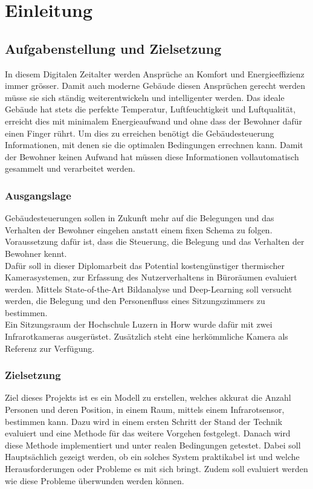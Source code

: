 \chapter{Einleitung}

\section{Aufgabenstellung und Zielsetzung}

In diesem Digitalen Zeitalter werden Ansprüche an Komfort und Energieeffizienz immer grösser. Damit auch moderne Gebäude diesen Ansprüchen gerecht werden müsse sie sich ständig weiterentwickeln und intelligenter werden. Das ideale Gebäude hat stets die perfekte Temperatur, Luftfeuchtigkeit und Luftqualität, erreicht dies mit minimalem Energieaufwand und ohne dass der Bewohner dafür einen Finger rührt. Um dies zu erreichen benötigt die Gebäudesteuerung Informationen, mit denen sie die optimalen Bedingungen errechnen kann. Damit der Bewohner keinen Aufwand hat müssen diese Informationen vollautomatisch gesammelt und verarbeitet werden.

\subsection{Ausgangslage}
\label{sec:Ausgangslage}

Gebäudesteuerungen sollen in Zukunft mehr auf die Belegungen und das Verhalten der Bewohner eingehen anstatt einem fixen Schema zu folgen. Voraussetzung dafür ist, dass die Steuerung, die Belegung und das Verhalten der Bewohner kennt.\\
Dafür soll in dieser Diplomarbeit das Potential kostengünstiger thermischer Kamerasystemen, zur Erfassung des Nutzerverhaltens in Büroräumen evaluiert werden. Mittels State-of-the-Art Bildanalyse und Deep-Learning soll versucht werden, die Belegung und den Personenfluss eines Sitzungszimmers zu bestimmen.\\
Ein Sitzungsraum der Hochschule Luzern in Horw wurde dafür mit zwei Infrarotkameras ausgerüstet. Zusätzlich steht eine herkömmliche Kamera als Referenz zur Verfügung.


\subsection{Zielsetzung}
\label{sec:Zielsetzung}

Ziel dieses Projekts ist es ein Modell zu erstellen, welches akkurat die Anzahl Personen und deren Position, in einem Raum, mittels einem Infrarotsensor, bestimmen kann. Dazu wird in einem ersten Schritt der Stand der Technik evaluiert und eine Methode für das weitere Vorgehen festgelegt. Danach wird diese Methode implementiert und unter realen Bedingungen getestet. Dabei soll Hauptsächlich gezeigt werden, ob ein solches System praktikabel ist und welche Herausforderungen oder Probleme es mit sich bringt. Zudem soll evaluiert werden wie diese Probleme überwunden werden können.



